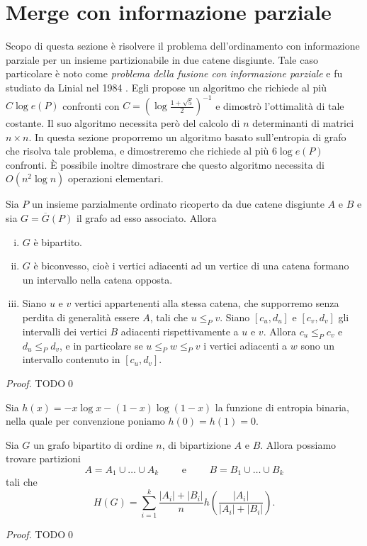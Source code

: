 \section{Merge con informazione parziale} Scopo di questa sezione \`e risolvere il problema dell'ordinamento con informazione parziale per un insieme partizionabile in due catene disgiunte. Tale caso particolare \`e noto come \emph{problema della fusione con informazione parziale} e fu studiato da Linial nel 1984 \cite{Linial1984}. Egli propose un algoritmo che richiede al pi\`u \(C\log{e(P)}\) confronti con \(C=\left(\log{\frac{1+\sqrt{5}}{2}}\right)^{-1}\) e dimostr\`o l'ottimalit\`a di tale costante. Il suo algoritmo necessita per\`o del calcolo di \(n\) determinanti di matrici \(n\times n\). In questa sezione proporremo un algoritmo basato sull'entropia di grafo che risolva tale problema, e dimostreremo che richiede al pi\`u \(6\log{e(P)}\) confronti. \`E possibile inoltre dimostrare che questo algoritmo necessita di \(O(n^2\log{n})\) operazioni elementari. 
\begin{lemma}
	\label{structurelemma} Sia \(P\) un insieme parzialmente ordinato ricoperto da due catene disgiunte \(A\) e \(B\) e sia \(G=\overline{G}(P)\) il grafo ad esso associato. Allora 
	\begin{enumerate}
		[(i)] 
		\item \(G\) è bipartito. 
		\item \(G\) è biconvesso, cio\`e i vertici adiacenti ad un vertice di una catena formano un intervallo nella catena opposta. 
		\item Siano \(u\) e \(v\) vertici appartenenti alla stessa catena, che supporremo senza perdita di generalità essere \(A\), tali che \(u\le_{P} v\). Siano \([c_u,d_u]\) e \([c_v,d_v]\) gli intervalli dei vertici \(B\) adiacenti rispettivamente a \(u\) e \(v\). Allora \(c_u\le_{P} c_v\) e \(d_u\le_{P} d_v\), e in particolare se \(u\le_{P}w\le_{P}v\) i vertici adiacenti a \(w\) sono un intervallo contenuto in \([c_u,d_v]\). 
	\end{enumerate}
\end{lemma}
\begin{proof}
	TODO\qed 
\end{proof}
Sia \(h(x)=-x\log{x}-(1-x)\log{(1-x)}\) la funzione di entropia binaria, nella quale per convenzione poniamo \(h(0)=h(1)=0\). 
\begin{theorem}
	 Sia \(G\) un grafo bipartito di ordine \(n\), di bipartizione \(A\) e \(B\). Allora possiamo trovare partizioni
	\[A=A_1\cup\dots\cup A_k\qquad\text{ e }\qquad B=B_1\cup\dots\cup B_k\]
	tali che
	\[H(G)=\sum_{i=1}^k{\frac{|A_i|+|B_i|}{n}h\left(\frac{|A_i|}{|A_i|+|B_i|}\right)}.\]
\end{theorem}
\begin{proof}
    TODO\qed
\end{proof}

